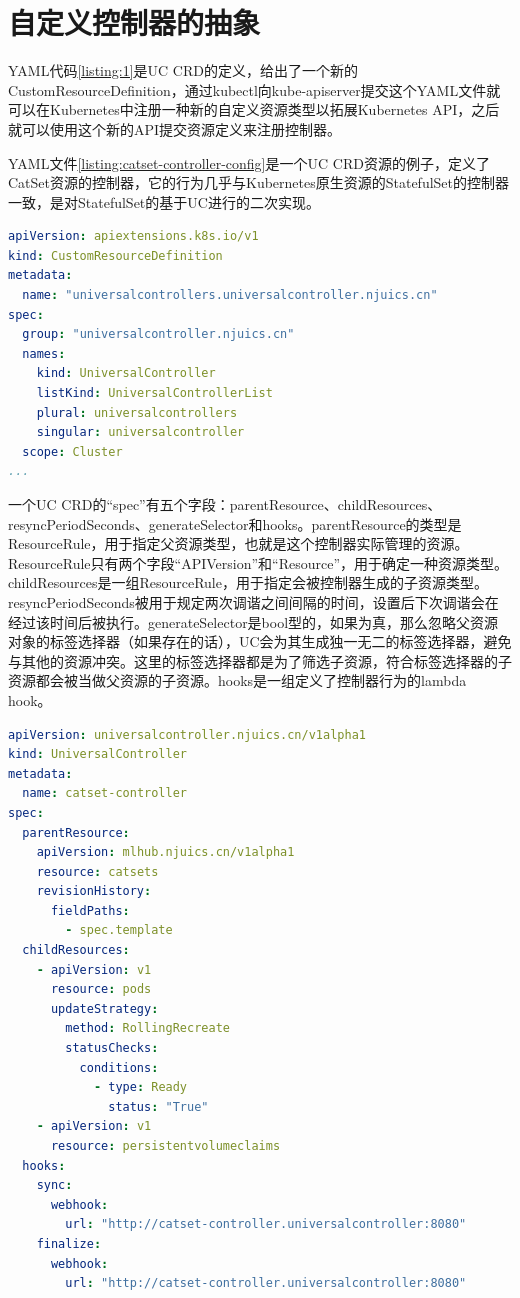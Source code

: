 \documentclass[macfonts,master]{njuthesis}
\begin{document}
\section{自定义控制器的抽象}
YAML代码\ref{listing:1}是UC CRD的定义，给出了一个新的CustomResourceDefinition，通过kubectl向kube-apiserver提交这个YAML文件就可以在Kubernetes中注册一种新的自定义资源类型以拓展Kubernetes API，之后就可以使用这个新的API提交资源定义来注册控制器。

YAML文件\ref{listing:catset-controller-config}是一个UC CRD资源的例子，定义了CatSet资源的控制器，它的行为几乎与Kubernetes原生资源的StatefulSet的控制器一致，是对StatefulSet的基于UC进行的二次实现。

\begin{lstlisting}[language=yaml,caption=UC CRD,label=listing:1]
apiVersion: apiextensions.k8s.io/v1
kind: CustomResourceDefinition
metadata:
  name: "universalcontrollers.universalcontroller.njuics.cn"
spec:
  group: "universalcontroller.njuics.cn"
  names:
    kind: UniversalController
    listKind: UniversalControllerList
    plural: universalcontrollers
    singular: universalcontroller
  scope: Cluster
...
\end{lstlisting}

一个UC CRD的``spec''有五个字段：parentResource、childResources、resyncPeriodSeconds、generateSelector和hooks。parentResource的类型是ResourceRule，用于指定父资源类型，也就是这个控制器实际管理的资源。ResourceRule只有两个字段``APIVersion''和``Resource''，用于确定一种资源类型。childResources是一组ResourceRule，用于指定会被控制器生成的子资源类型。resyncPeriodSeconds被用于规定两次调谐之间间隔的时间，设置后下次调谐会在经过该时间后被执行。generateSelector是bool型的，如果为真，那么忽略父资源对象的标签选择器（如果存在的话），UC会为其生成独一无二的标签选择器，避免与其他的资源冲突。这里的标签选择器都是为了筛选子资源，符合标签选择器的子资源都会被当做父资源的子资源。hooks是一组定义了控制器行为的lambda hook。

\begin{lstlisting}[language=yaml,caption=作为UC CRD示例的catset-controller,label=listing:catset-controller-config]
apiVersion: universalcontroller.njuics.cn/v1alpha1
kind: UniversalController
metadata:
  name: catset-controller
spec:
  parentResource:
    apiVersion: mlhub.njuics.cn/v1alpha1
    resource: catsets
    revisionHistory:
      fieldPaths:
        - spec.template
  childResources:
    - apiVersion: v1
      resource: pods
      updateStrategy:
        method: RollingRecreate
        statusChecks:
          conditions:
            - type: Ready
              status: "True"
    - apiVersion: v1
      resource: persistentvolumeclaims
  hooks:
    sync:
      webhook:
        url: "http://catset-controller.universalcontroller:8080"
    finalize:
      webhook:
        url: "http://catset-controller.universalcontroller:8080"
\end{lstlisting}
\end{document}
